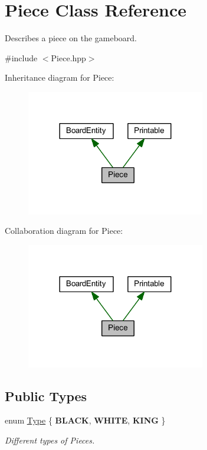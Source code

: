 \hypertarget{class_piece}{\section{Piece Class Reference}
\label{class_piece}
}


Describes a piece on the gameboard.  




{\ttfamily \#include $<$Piece.\-hpp$>$}



Inheritance diagram for Piece\-:\nopagebreak
\begin{figure}[H]
\begin{center}
\leavevmode
\includegraphics[width=221pt]{class_piece__inherit__graph}
\end{center}
\end{figure}


Collaboration diagram for Piece\-:\nopagebreak
\begin{figure}[H]
\begin{center}
\leavevmode
\includegraphics[width=221pt]{class_piece__coll__graph}
\end{center}
\end{figure}
\subsection*{Public Types}
\begin{DoxyCompactItemize}
\item 
enum \hyperlink{class_piece_abcd044975b3657962abfd2ded9194b09}{Type} \{ {\bfseries B\-L\-A\-C\-K}, 
{\bfseries W\-H\-I\-T\-E}, 
{\bfseries K\-I\-N\-G}
 \}
\begin{DoxyCompactList}\small\item\em Different types of Pieces. \end{DoxyCompactList}\end{DoxyCompactItemize}
